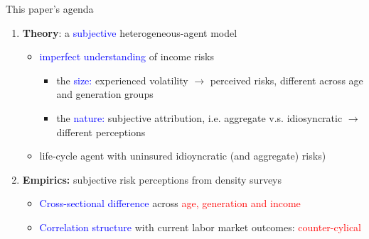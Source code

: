 \documentclass{beamer}
\begin{document}
\begin{frame}{This paper's agenda}
	\begin{enumerate}
			\item \textbf{Theory}: a \textcolor{blue}{subjective} heterogeneous-agent model 
		\begin{itemize}
			\item  \textcolor{blue}{imperfect understanding} of income risks
			\begin{itemize}
				\item the \textcolor{blue}{size:} experienced volatility $\rightarrow$  perceived risks, different across age and generation groups
				\item the \textcolor{blue}{nature:} subjective attribution, i.e.  aggregate v.s. idiosyncratic  $\rightarrow$ different perceptions
			\end{itemize}
			\item life-cycle agent with uninsured idioyncratic (and aggregate) risks)
		\end{itemize} 
		\item \textbf{Empirics:} subjective risk perceptions from density surveys
		\begin{itemize}
			\item \textcolor{blue}{Cross-sectional difference} across \textcolor{red}{age, generation and income} 
			\item \textcolor{blue}{Correlation structure} with current labor market outcomes: \textcolor{red}{counter-cylical} 
		\end{itemize}
	
	\end{enumerate}
\end{frame}
\end{document}
